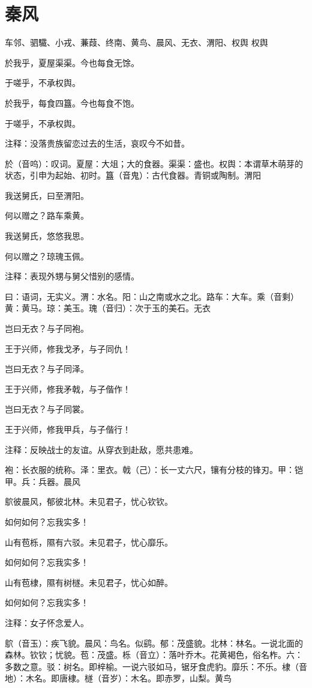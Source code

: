 \documentclass[12pt,UTF8]{ctexbook}
\begin{document}
\part{秦风}
车邻、驷驖、小戎、蒹葭、终南、黄鸟、晨风、无衣、渭阳、权舆
权舆

於我乎，夏屋渠渠。今也每食无馀。

于嗟乎，不承权舆。

於我乎，每食四簋。今也每食不饱。

于嗟乎，不承权舆。

注释：没落贵族留恋过去的生活，哀叹今不如昔。

於（音呜）：叹词。夏屋：大俎；大的食器。渠渠：盛也。权舆：本谓草木萌芽的状态，引申为起始、初时。簋（音鬼）：古代食器。青铜或陶制。渭阳

我送舅氏，曰至渭阳。

何以赠之？路车乘黄。

我送舅氏，悠悠我思。

何以赠之？琼瑰玉佩。

注释：表现外甥与舅父惜别的感情。

曰：语词，无实义。渭：水名。阳：山之南或水之北。路车：大车。乘（音剩）黄：黄马。琼：美玉。瑰（音归）：次于玉的美石。无衣

岂曰无衣？与子同袍。

王于兴师，修我戈矛，与子同仇！

岂曰无衣？与子同泽。

王于兴师，修我矛戟，与子偕作！

岂曰无衣？与子同裳。

王于兴师，修我甲兵，与子偕行！

注释：反映战士的友谊。从穿衣到赴敌，愿共患难。

袍：长衣服的统称。泽：里衣。戟（己）：长一丈六尺，镶有分枝的锋刃。甲：铠甲。兵：兵器。晨风

鴥彼晨风，郁彼北林。未见君子，忧心钦钦。

如何如何？忘我实多！

山有苞栎，隰有六驳。未见君子，忧心靡乐。

如何如何？忘我实多！

山有苞棣，隰有树檖。未见君子，忧心如醉。

如何如何？忘我实多！

注释：女子怀念爱人。

鴥（音玉）：疾飞貌。晨风：鸟名。似鹞。郁：茂盛貌。北林：林名。一说北面的森林。钦钦；忧貌。苞：茂盛。栎（音立）：落叶乔木。花黄褐色，俗名柞。六：多数之意。驳：树名。即梓榆。一说六驳如马，锯牙食虎豹。靡乐：不乐。棣（音地）：木名。即唐棣。檖（音岁）：木名。即赤罗，山梨。黄鸟
\end{document}
